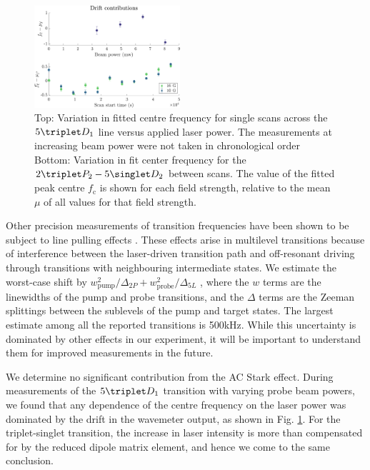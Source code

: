 \begin{figure}[t]
\includegraphics[width=0.48\textwidth]{fig/spectroscopy/power-drift-combined-eps-converted-to.pdf}
\caption{Top: Variation in fitted centre frequency for single scans across the $5\triplet D_1$ line versus applied laser power.
	The measurements at increasing beam power were not taken in chronological order Bottom: Variation in fit center frequency for the $2\triplet P_2 - 5\singlet D_2$ between scans.
	The value of the fitted peak centre $f_\textrm{c}$ is shown for each field strength, relative to the mean $\mu$ of all values for that field strength.}
\label{fig:power_drift_combined}
\end{figure}

Other precision measurements of transition frequencies have been shown to be subject to line pulling effects \cite{Marsman15,Marsman15PRA}.
	These effects arise in multilevel transitions because of interference between the laser-driven transition path and off-resonant driving through transitions with neighbouring intermediate states.
	We estimate the worst-case shift by $w_{\text{pump}}^2/\Delta_{2P} + w_{\text{probe}}^2/\Delta_{5L}$ \cite{Marsman15,Marsman15PRA}, where the $w$ terms are the linewidths of the pump and probe transitions, and the $\Delta$ terms are the Zeeman splittings between the sublevels of the pump and target states.
	The largest estimate among all the reported transitions is 500kHz.
	While this uncertainty is dominated by other effects in our experiment, it will be important to understand them for improved measurements in the future.


We determine no significant contribution from the AC Stark effect.
	During measurements of the $5\triplet D_1$ transition with varying probe beam powers, we found that any dependence of the centre frequency on the laser power was dominated by the drift in the wavemeter output, as shown in Fig.
	\ref{fig:power_drift_combined}.
	For the triplet-singlet transition, the increase in laser intensity is more than compensated for by the reduced dipole matrix element, and hence we come to the same conclusion.
	



